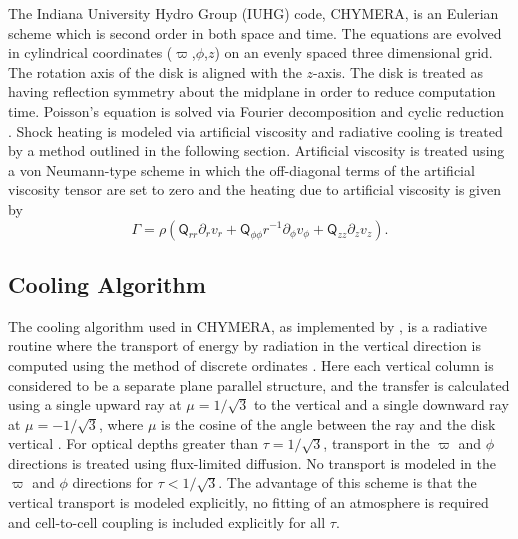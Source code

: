 \documentclass[12pt,preprint2]{aastex}
\begin{document}
The Indiana University Hydro Group (IUHG) code, CHYMERA, is an Eulerian scheme which is second order in both space and
time. The equations are evolved in cylindrical coordinates ($\varpi$,$\phi$,$z$) on an evenly spaced three dimensional
grid. The rotation axis of the disk is aligned with the $z$-axis. The disk is treated as having reflection symmetry about
the midplane in order to reduce computation time. Poisson's equation is solved via Fourier decomposition and cyclic
reduction \citep{tohline1980}. Shock heating is modeled via artificial viscosity \citep{pickettphd1995} and radiative
cooling is treated by a method outlined in the following section. Artificial viscosity is treated using a von
Neumann-type scheme \citep{norman1986} in which the off-diagonal terms of the artificial viscosity tensor are set to
zero and the heating due to artificial viscosity is given by
 \begin{equation}
 \Gamma = \rho(\mathsf{Q}_{rr}\partial_r v_r + \mathsf{Q}_{\phi\phi} r^{-1}\partial_\phi v_\phi + \mathsf{Q}_{zz} \partial_z v_z). 
\end{equation}

\subsection{Cooling Algorithm}
\label{sec:cooling}

The cooling algorithm used in CHYMERA, as implemented by \citet{boley2007b}, is a radiative routine where the transport
of energy by radiation in the vertical direction is computed using the method of discrete ordinates
\citep{chandra1960}. Here each vertical column is considered to be a separate plane parallel structure, and the transfer
is calculated using a single upward ray at $\mu = 1/\sqrt{3}$ to the vertical and a single downward ray at $\mu =
-1/\sqrt{3}$, where $\mu$ is the cosine of the angle between the ray and the disk vertical . For optical depths greater
than $\tau = 1/\sqrt{3}$, transport in the $\varpi$ and $\phi$ directions is treated using flux-limited diffusion. No
transport is modeled in the $\varpi$ and $\phi$ directions for $\tau < 1/\sqrt{3}$. The advantage of this scheme is that
the vertical transport is modeled explicitly, no fitting of an atmosphere is required and cell-to-cell coupling is
included explicitly for all $\tau$.
\end{document}

